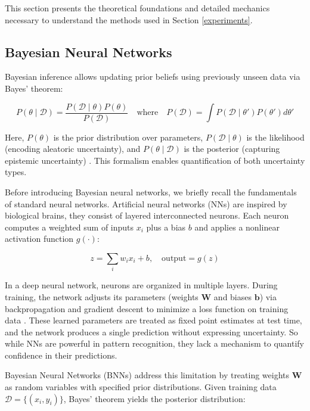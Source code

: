 
This section presents the theoretical foundations and detailed mechanics necessary to understand
the methods used in Section \ref{experiments}.

\subsection{Bayesian Neural Networks}
\label{methodology:bnns}
Bayesian inference allows updating prior beliefs using previously unseen data via Bayes' theorem:

\begin{equation}
P(\theta \mid \mathcal{D}) = \frac{P(\mathcal{D} \mid \theta) P(\theta)}{P(\mathcal{D})} 
\quad \text{where} \quad 
P(\mathcal{D}) = \int P(\mathcal{D} \mid \theta') P(\theta')  d\theta'
\label{eq:bayes}
\end{equation}

Here, $P(\theta)$ is the prior distribution over parameters, $P(\mathcal{D} \mid \theta)$ is the
likelihood (encoding aleatoric uncertainty), and $P(\theta \mid \mathcal{D})$ is the posterior
(capturing epistemic uncertainty) \citep{Jospin2022bnns}.
This formalism enables quantification of both uncertainty types.

\vspace{0.15cm}
Before introducing Bayesian neural networks, we briefly recall the fundamentals of standard neural
networks. Artificial neural networks (NNs) are inspired by biological brains, they consist of layered
interconnected neurons. Each neuron computes a weighted sum of inputs $x_i$ plus a bias $b$
and applies a nonlinear activation function $g(\cdot)$:

\[
z = \sum_{i} w_i x_i + b, \quad \text{output} = g(z)
\]

In a deep neural network, neurons are organized in multiple layers. During training, the network adjusts
its parameters (weights $\mathbf{W}$ and biases $\mathbf{b}$) via backpropagation and gradient
descent to minimize a loss function on training data \citep{Haykin2009, López2022anns&dl}.
These learned parameters are treated as fixed point estimates at test time, and the network produces a
single prediction without expressing uncertainty. So while NNs are powerful in pattern recognition,
they lack a mechanism to quantify confidence in their predictions.

\vspace{0.15cm}
Bayesian Neural Networks (BNNs) address this limitation by treating weights $\mathbf{W}$ as random 
variables with specified prior distributions. Given training data $\mathcal{D} = \{(x_i, y_i)\}$,
Bayes' theorem yields the posterior distribution:

